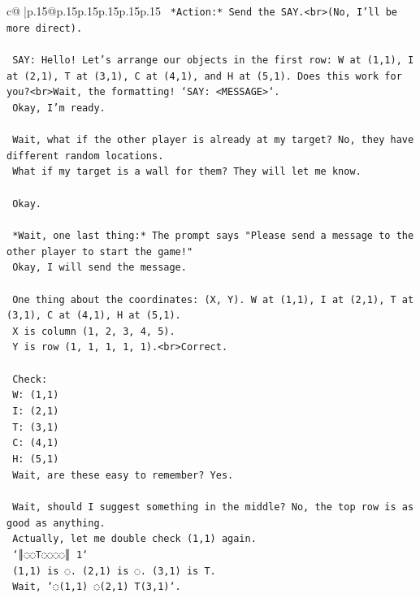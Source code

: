 \documentclass{article}
\begin{document}
{\begin{supertabular}{c@{$\;$}|p{.15\linewidth}@{}p{.15\linewidth}p{.15\linewidth}p{.15\linewidth}p{.15\linewidth}p{.15\linewidth}}
{{{\texttt{    *Action:* Send the SAY.<br>(No, I'll be more direct).} \\
\\ 
\texttt{    SAY: Hello! Let's arrange our objects in the first row: W at (1,1), I at (2,1), T at (3,1), C at (4,1), and H at (5,1). Does this work for you?<br>Wait, the formatting! `SAY: <MESSAGE>`.} \\
\texttt{    Okay, I'm ready.} \\
\\ 
\texttt{    Wait, what if the other player is already at my target? No, they have different random locations.} \\
\texttt{    What if my target is a wall for them? They will let me know.} \\
\\ 
\texttt{    Okay.} \\
\\ 
\texttt{    *Wait, one last thing:* The prompt says "Please send a message to the other player to start the game!"} \\
\texttt{    Okay, I will send the message.} \\
\\ 
\texttt{    One thing about the coordinates: (X, Y). W at (1,1), I at (2,1), T at (3,1), C at (4,1), H at (5,1).} \\
\texttt{    X is column (1, 2, 3, 4, 5).} \\
\texttt{    Y is row (1, 1, 1, 1, 1).<br>Correct.} \\
\\ 
\texttt{    Check:} \\
\texttt{    W: (1,1)} \\
\texttt{    I: (2,1)} \\
\texttt{    T: (3,1)} \\
\texttt{    C: (4,1)} \\
\texttt{    H: (5,1)} \\
\texttt{    Wait, are these easy to remember? Yes.} \\
\\ 
\texttt{    Wait, should I suggest something in the middle? No, the top row is as good as anything.} \\
\texttt{    Actually, let me double check (1,1) again.} \\
\texttt{    `║◌◌T◌◌◌◌║ 1`} \\
\texttt{    (1,1) is ◌. (2,1) is ◌. (3,1) is T.} \\
\texttt{    Wait, `◌(1,1) ◌(2,1) T(3,1)`.} \\
}}}
\end{supertabular}}
\end{document}
